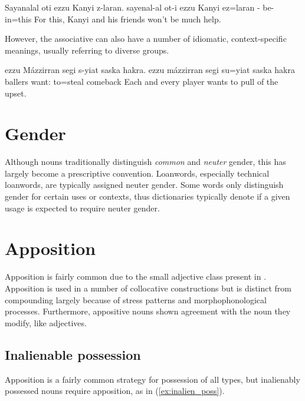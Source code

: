 \begin{example} \label{ex:ezzu_basic}
    \script Sayanalal oti ezzu Kanyi z-laran.
    \bits sayenal-al ot-i ezzu Kanyi ez=laran
    - be-   in=this
    \tr For this, Kanyi and his friends won't be much help.
\end{example}

However, the associative can also have a number of idiomatic, context-specific meanings, usually referring to diverse groups.

\begin{example} \label{ex:ezzu_idiom}
    \script ezzu Mázzirran segi s-yiat saska hakra.
    \bits ezzu mázzirran segi su=yiat {saska hakra}
    \gloss {} ballers want: to=steal comeback
    \tr Each and every player wants to pull of the upset.
\end{example}

\section{Gender}
Although nouns traditionally distinguish \emph{common} and \emph{neuter} gender, this has largely become a prescriptive convention.  Loanwords, especially technical loanwords, are typically assigned neuter gender. Some words only distinguish gender for certain uses or contexts, thus dictionaries typically denote if a given usage is expected to require neuter gender.

\section{Apposition}
Apposition is fairly common due to the small adjective class present in \langname{}. Apposition is used in a number of collocative constructions but is distinct from compounding largely because of stress patterns and morphophonological processes. Furthermore, appositive nouns shown agreement with the noun they modify, like adjectives.

\subsection{Inalienable possession}
Apposition is a fairly common strategy for possession of all types, but inalienably possessed nouns require apposition, as in (\ref{ex:inalien_poss}).

